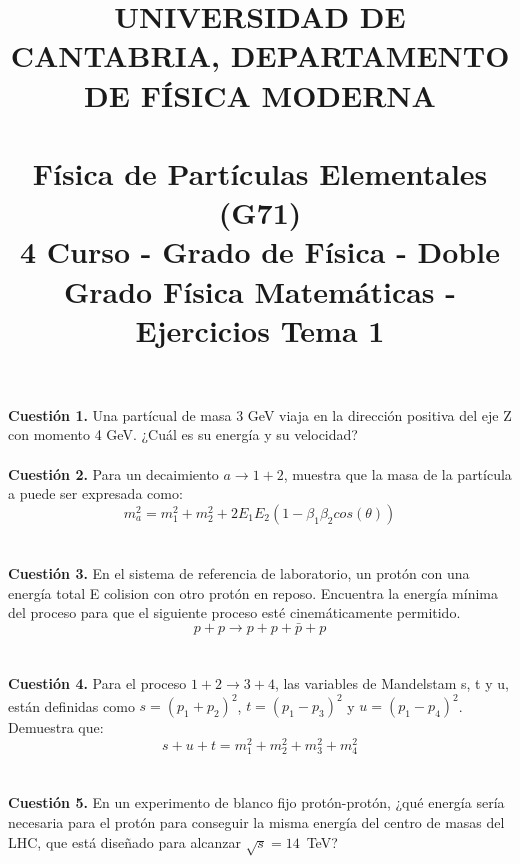 \documentclass[paper=a4, fontsize=11pt]{scrartcl} %
\date{}
\title{	
\normalfont \normalsize 
\textsc{UNIVERSIDAD DE CANTABRIA, DEPARTAMENTO DE FÍSICA MODERNA} \\ [20pt] %
\horrule{0.5pt} \\[0.4cm] %
\huge Física de Partículas Elementales (G71) \\ %
\normalsize 4 Curso - Grado de Física - Doble Grado Física Matemáticas - Ejercicios Tema 1
\horrule{2pt} \\[0.5cm] %
}
\numberwithin{equation}{section} %
\numberwithin{figure}{section} %
\numberwithin{table}{section} %
\begin{document}
\maketitle %

\vspace{-2.5cm}

\textbf{Cuestión 1.} Una partícual de masa 3 GeV viaja en la dirección positiva del eje Z con momento 4 GeV. ¿Cuál es su energía y su velocidad?
\\
\\
\textbf{Cuestión 2.} Para un decaimiento $a\rightarrow 1 + 2$, muestra que la masa de la partícula a puede ser expresada como:
\begin{equation*}
m_{a}^2 = m_1^2 + m_2^2 + 2E_1E_2(1-\beta_1\beta_2cos(\theta))
\end{equation*}
\\
\\
\textbf{Cuestión 3.} En el sistema de referencia de laboratorio, un protón con una energía total E colision con otro protón en reposo. Encuentra la energía mínima del proceso para
que el siguiente proceso esté cinemáticamente permitido.
\begin{equation*}
p + p \rightarrow p + p + \bar{p} + p
\end{equation*}
\\
\\
\textbf{Cuestión 4.} Para el proceso $1 + 2 \rightarrow 3 + 4$, las variables de Mandelstam s, t y u, están definidas como $s = (p_1+p_2)^2$, $t = (p_1-p_3)^2$ y $u = (p_1-p_4)^2$. Demuestra que:
\begin{equation*}
s + u + t = m_1^2 + m_2^2 + m_3^2 + m_4^2
\end{equation*}
\\
\\
\textbf{Cuestión 5.} En un experimento de blanco fijo protón-protón, ¿qué energía sería necesaria para el protón para conseguir la misma energía del centro de masas del LHC, que está diseñado para
alcanzar $\sqrt{s}=14$~TeV?
\end{document}
